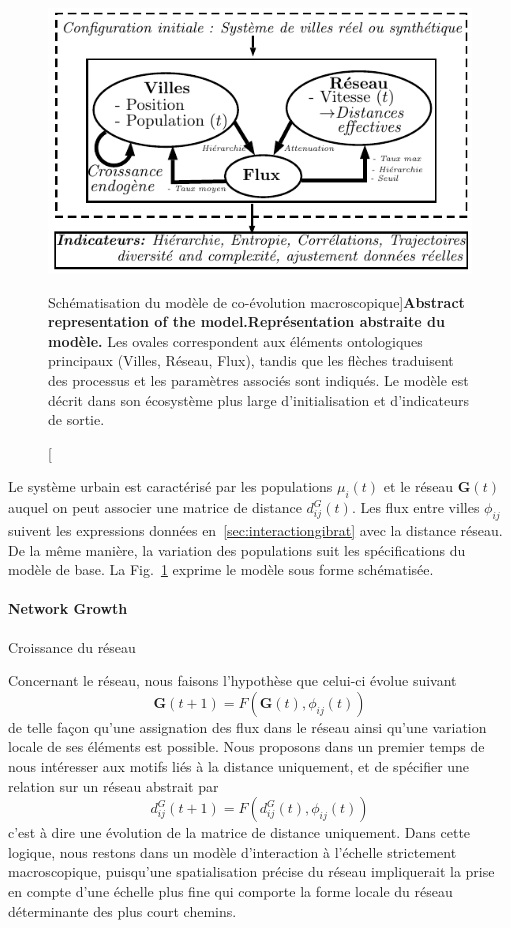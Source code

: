 \begin{figure}
\includegraphics[width=\linewidth]{Figures/MacroCoEvol/model}
\caption[Schematic Model Representation][Schématisation du modèle de co-évolution macroscopique]{\textbf{Abstract representation of the model.}}{\textbf{Représentation abstraite du modèle.} Les ovales correspondent aux éléments ontologiques principaux (Villes, Réseau, Flux), tandis que les flèches traduisent des processus et les paramètres associés sont indiqués. Le modèle est décrit dans son écosystème plus large d'initialisation et d'indicateurs de sortie.\label{fig:macrocoevol:model}}
\end{figure}



Le système urbain est caractérisé par les populations $\mu_i(t)$ et le réseau $\mathbf{G}(t)$ auquel on peut associer une matrice de distance $d^G_{ij}(t)$. Les flux entre villes $\phi_{ij}$ suivent les expressions données en~\ref{sec:interactiongibrat} avec la distance réseau. De la même manière, la variation des populations suit les spécifications du modèle de base. La Fig.~\ref{fig:macrocoevol:model} exprime le modèle sous forme schématisée.




\paragraph{Network Growth}{Croissance du réseau}


Concernant le réseau, nous faisons l'hypothèse que celui-ci évolue suivant
\[
\mathbf{G}(t + 1) = F(\mathbf{G}(t),\phi_{ij}(t))
\]
de telle façon qu'une assignation des flux dans le réseau ainsi qu'une variation locale de ses éléments est possible. Nous proposons dans un premier temps de nous intéresser aux motifs liés à la distance uniquement, et de spécifier une relation sur un réseau abstrait par
\[
d^G_{ij}(t+1) = F(d^G_{ij}(t),\phi_{ij}(t))
\]
c'est à dire une évolution de la matrice de distance uniquement. Dans cette logique, nous restons dans un modèle d'interaction à l'échelle strictement macroscopique, puisqu'une spatialisation précise du réseau impliquerait la prise en compte d'une échelle plus fine qui comporte la forme locale du réseau déterminante des plus court chemins.

